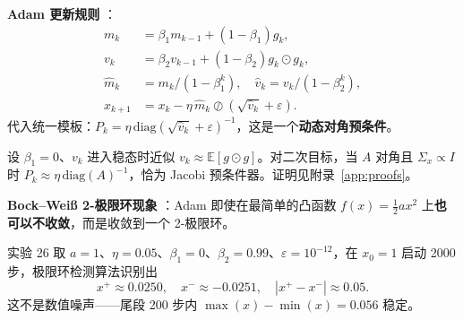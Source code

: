 \textbf{Adam 更新规则} \cite{kingma2015adam}：
\[
\begin{aligned}
  m_k &= \beta_1 m_{k-1} + (1-\beta_1) g_k, \\
  v_k &= \beta_2 v_{k-1} + (1-\beta_2) g_k \odot g_k, \\
  \hat m_k &= m_k/(1-\beta_1^k),\quad \hat v_k = v_k/(1-\beta_2^k), \\
  x_{k+1} &= x_k - \eta\,\hat m_k \oslash (\sqrt{\hat v_k} + \varepsilon).
\end{aligned}
\]
代入统一模板：$P_k = \eta\,\mathrm{diag}(\sqrt{\hat v_k} + \varepsilon)^{-1}$，这是一个\textbf{动态对角预条件}。

\begin{proposition}
\label{prop:adam-jacobi}
设 $\beta_1 = 0$、$v_k$ 进入稳态时近似 $v_k \approx \mathbb{E}[g \odot g]$。对二次目标，当 $A$ 对角且 $\Sigma_x \propto I$ 时 $P_k \approx \eta\,\mathrm{diag}(A)^{-1}$，恰为 Jacobi 预条件器。证明见附录~\ref{app:proofs}。
\end{proposition}

\textbf{Bock--Wei{\ss} 2-极限环现象} \cite{bock2022adam}：Adam 即使在最简单的凸函数 $f(x) = \tfrac{1}{2} a x^2$ 上\textbf{也可以不收敛}，而是收敛到一个 2-极限环。

\begin{example}
实验 26 取 $a = 1$、$\eta = 0.05$、$\beta_1 = 0$、$\beta_2 = 0.99$、$\varepsilon = 10^{-12}$，在 $x_0 = 1$ 启动 2000 步，极限环检测算法识别出
\[
  x^+ \approx 0.0250,\quad x^- \approx -0.0251,\quad |x^+ - x^-| \approx 0.05.
\]
这不是数值噪声——尾段 200 步内 $\max(x) - \min(x) = 0.056$ 稳定。
\end{example}
